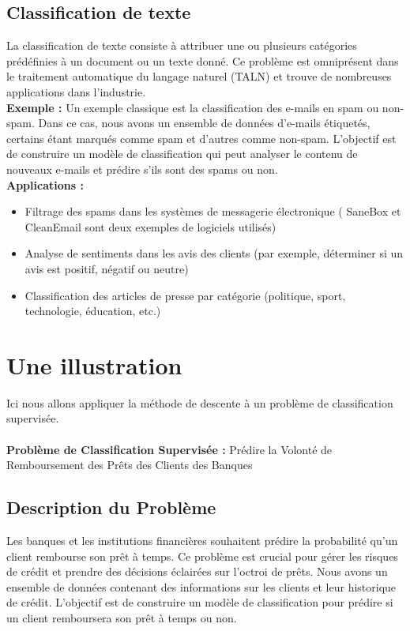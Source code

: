 \documentclass[12pt,a4paper,openay]{book}
\numberwithin{equation}{chapter}
\begin{document}
	\subsection{Classification de texte}
	La classification de texte consiste \`a attribuer une ou plusieurs cat\'egories pr\'ed\'efinies \`a un document ou un texte donn\'e. Ce probl\`eme est omnipr\'esent dans le traitement automatique du langage naturel (TALN) et trouve de nombreuses applications dans l'industrie.\\
	\textbf{Exemple :} Un exemple classique est la classification des e-mails en spam ou non-spam. Dans ce cas, nous avons un ensemble de donn\'ees d'e-mails \'etiquet\'es, certains \'etant marqu\'es comme spam et d'autres comme non-spam. L'objectif est de construire un mod\`ele de classification qui peut analyser le contenu de nouveaux e-mails et pr\'edire s'ils sont des spams ou non.\\	
	\textbf{Applications :}
	\begin{itemize}
		\item Filtrage des spams dans les syst\`emes de messagerie \'electronique ( SaneBox et CleanEmail sont deux exemples de logiciels utilisés)
		\item Analyse de sentiments dans les avis des clients (par exemple, d\'eterminer si un avis est positif, n\'egatif ou neutre)
		\item Classification des articles de presse par cat\'egorie (politique, sport, technologie, éducation, etc.)
	\end{itemize}
	
	
	\section{Une illustration}
	Ici nous allons appliquer la m\'ethode de descente \`a un probl\`eme de classification supervis\'ee.\\\\
	\textbf{\large Probl\`eme de Classification Supervis\'ee :} Pr\'edire la Volont\'e de Remboursement des Pr\^ets des Clients des Banques	
	\subsection*{Description du Probl\`eme}
	
	Les banques et les institutions financi\`eres souhaitent pr\'edire la probabilit\'e qu'un client rembourse son pr\^et \`a temps. Ce probl\`eme est crucial pour g\'erer les risques de cr\'edit et prendre des d\'ecisions \'eclair\'ees sur l'octroi de pr\^ets. Nous avons un ensemble de donn\'ees contenant des informations sur les clients et leur historique de cr\'edit. L'objectif est de construire un mod\`ele de classification pour pr\'edire si un client remboursera son pr\^et \`a temps ou non.
	
\end{document}
